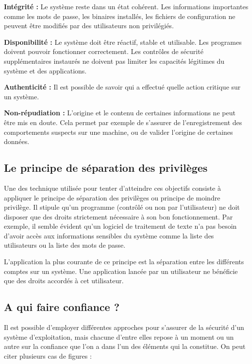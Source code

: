 \textbf{Intégrité :}
Le système reste dans un état cohérent. Les informations importantes comme les mots de passe, les binaires installés, les fichiers de configuration ne peuvent être modifiés par des utilisateurs non privilégiés.

\textbf{Disponibilité :}
Le système doit être réactif, stable et utilisable. Les programes doivent pouvoir fonctionner correctement. Les contrôles de sécurité supplémentaires instaurés ne doivent pas limiter les capacités légitimes du système et des applications.

\textbf{Authenticité :}
Il est possible de savoir qui a effectué quelle action critique sur un système.

\textbf{Non-répudiation :}
L'origine et le contenu de certaines informations ne peut être mis en doute. Cela permet par exemple de s'assurer de l'enregistrement des comportements suspects sur une machine, ou de valider l'origine de certaines données.

\subsection{Le principe de séparation des privilèges}

Une des technique utilisée pour tenter d'atteindre ces objectifs consiste à appliquer le principe de séparation des privilèges ou principe de moindre privilège. Il stipule qu'un programme (contrôlé ou non par l'utilisateur) ne doit disposer que des droits strictement nécessaire à son bon fonctionnement. Par exemple, il semble évident qu'un logiciel de traitement de texte n'a pas besoin d'avoir accès aux informations sensibles du système comme la liste des utilisateurs ou la liste des mots de passe.

L'application la plus courante de ce principe est la séparation entre les différents comptes sur un système. Une application lancée par un utilisateur ne bénéficie que des droits accordés à cet utilisateur.

\subsection{A qui faire confiance ?}

Il est possible d'employer différentes approches pour s'assurer de la sécurité d'un système d'exploitation, mais chacune d'entre elles repose à un moment ou un autre sur la confiance que l'on a dans l'un des éléments qui la constitue. On peut citer plusieurs cas de figures \cite{WCS}:

